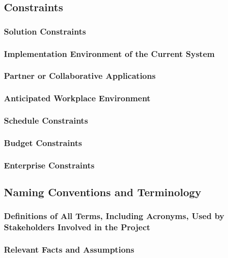 \documentclass[12pt]{article}
\begin{document}
\subsection{Constraints}

\subsubsection{Solution Constraints}

\subsubsection{Implementation Environment of the Current System}

\subsubsection{Partner or Collaborative Applications} 

\subsubsection{Anticipated Workplace Environment}

\subsubsection{Schedule Constraints}

\subsubsection{Budget Constraints}

\subsubsection{Enterprise Constraints}

\subsection{Naming Conventions and Terminology}

\subsubsection{Definitions of All Terms, Including Acronyms, Used by Stakeholders Involved in the Project }

\subsubsection{Relevant Facts and Assumptions}
\end{document}
